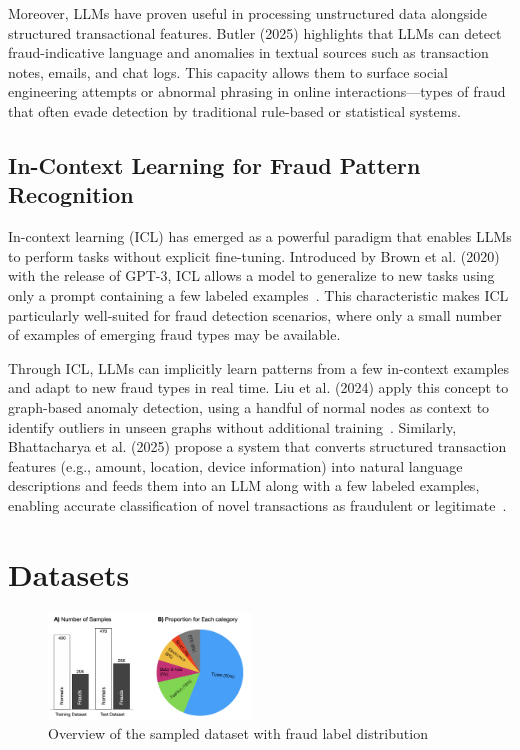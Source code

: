 \documentclass[sigconf]{acmart}
\begin{document}
Moreover, LLMs have proven useful in processing unstructured data alongside structured transactional features. Butler (2025) highlights that LLMs can detect fraud-indicative language and anomalies in textual sources such as transaction notes, emails, and chat logs. This capacity allows them to surface social engineering attempts or abnormal phrasing in online interactions—types of fraud that often evade detection by traditional rule-based or statistical systems.


\subsection{In-Context Learning for Fraud Pattern Recognition}
In-context learning (ICL) has emerged as a powerful paradigm that enables LLMs to perform tasks without explicit fine-tuning. Introduced by Brown et al. (2020) with the release of GPT-3, ICL allows a model to generalize to new tasks using only a prompt containing a few labeled examples~\cite{brown2020llm_fewshot}. This characteristic makes ICL particularly well-suited for fraud detection scenarios, where only a small number of examples of emerging fraud types may be available.

Through ICL, LLMs can implicitly learn patterns from a few in-context examples and adapt to new fraud types in real time. Liu et al. (2024) apply this concept to graph-based anomaly detection, using a handful of normal nodes as context to identify outliers in unseen graphs without additional training~\cite{liu2024anomaly}. Similarly, Bhattacharya et al. (2025) propose a system that converts structured transaction features (e.g., amount, location, device information) into natural language descriptions and feeds them into an LLM along with a few labeled examples, enabling accurate classification of novel transactions as fraudulent or legitimate~\cite{bhattacharya2024fraud}.



\section{Datasets}\label{datasets}

\begin{figure}[t!]
  \centering
  \includegraphics[width=0.48\textwidth]{figures/fig_dataset.png}
  \caption{Overview of the sampled dataset with fraud label distribution}
  \label{fig_dataset}
\end{figure}
\end{document}
